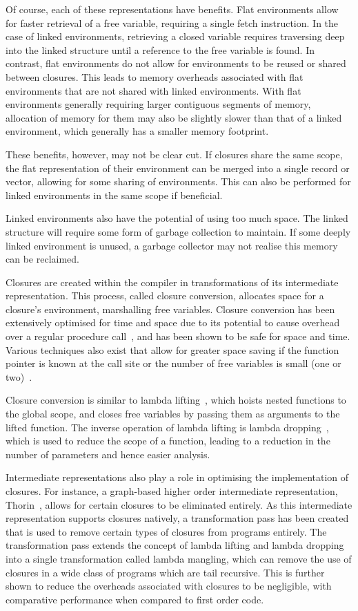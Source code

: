 Of course, each of these representations have benefits. Flat environments allow for faster retrieval of a free variable, requiring a single fetch instruction. In the case of linked environments, retrieving a closed variable requires traversing deep into the linked structure until a reference to the free variable is found. In contrast, flat environments do not allow for environments to be reused or shared between closures. This leads to memory overheads associated with flat environments that are not shared with linked environments. With flat environments generally requiring larger contiguous segments of memory, allocation of memory for them may also be slightly slower than that of a linked environment, which generally has a smaller memory footprint.

These benefits, however, may not be clear cut. If closures share the same scope, the flat representation of their environment can be merged into a single record or vector, allowing for some sharing of environments. This can also be performed for linked environments in the same scope if beneficial.

Linked environments also have the potential of using too much space. The linked structure will require some form of garbage collection to maintain. If some deeply linked environment is unused, a garbage collector may not realise this memory can be reclaimed.

Closures are created within the compiler in transformations of its intermediate representation. This process, called closure conversion, allocates space for a closure's environment, marshalling free variables. Closure conversion has been extensively optimised for time and space due to its potential to cause overhead over a regular procedure call~\cite{shao2000efficient,paraskevopoulou2019closure}, and has been shown to be safe for space and time. Various techniques also exist that allow for greater space saving if the function pointer is known at the call site or the number of free variables is small (one or two)~\cite{keep2012optimizing}.

Closure conversion is similar to lambda lifting~\cite{johnsson1985lambda}, which hoists nested functions to the global scope, and closes free variables by passing them as arguments to the lifted function. The inverse operation of lambda lifting is lambda dropping~\cite{danvy1997lambda}, which is used to reduce the scope of a function, leading to a reduction in the number of parameters and hence easier analysis.

Intermediate representations also play a role in optimising the implementation of closures. For instance, a graph-based higher order intermediate representation, Thorin~\cite{leissa2015graph}, allows for certain closures to be eliminated entirely. As this intermediate representation supports closures natively, a transformation pass has been created that is used to remove certain types of closures from programs entirely. The transformation pass extends the concept of lambda lifting and lambda dropping into a single transformation called lambda mangling, which can remove the use of closures in a wide class of programs which are tail recursive. This is further shown to reduce the overheads associated with closures to be negligible, with comparative performance when compared to first order code.
